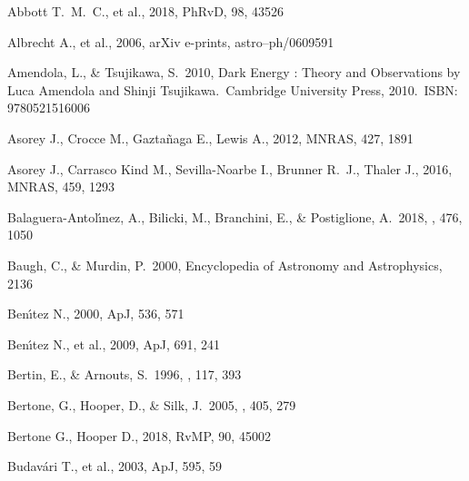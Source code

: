 \documentclass[a4paper,fleqn,usenatbib]{mnras}
\begin{document}
\begin{thebibliography}{99}

 Abbott T.~M.~C., et al., 2018, PhRvD, 98, 43526

 Albrecht A., et al., 2006, arXiv e-prints, astro–ph/0609591

 Amendola, L., \& Tsujikawa, S.\ 2010, Dark Energy : Theory and Observations by Luca Amendola and Shinji Tsujikawa.~Cambridge University Press, 2010.~ISBN: 9780521516006

 Asorey J., Crocce M., Gazta{\~n}aga E., Lewis A., 2012, MNRAS, 427, 1891

 Asorey J., Carrasco Kind M., Sevilla-Noarbe I., Brunner R.~J., Thaler J., 2016, MNRAS, 459, 1293

 Balaguera-Antol{\'{\i}}nez, A., Bilicki, M., Branchini, E., \& Postiglione, A.\ 2018, \mnras, 476, 1050 

 Baugh, C., \& Murdin, P.\ 2000, Encyclopedia of Astronomy and Astrophysics, 2136 

 Ben{\'\i}tez N., 2000, ApJ, 536, 571

 Ben{\'\i}tez N., et al., 2009, ApJ, 691, 241

 Bertin, E., \& Arnouts, S.\ 1996, \aaps, 117, 393 

 Bertone, G., Hooper, D., \& Silk, J.\ 2005, \physrep, 405, 279 

 Bertone G., Hooper D., 2018, RvMP, 90, 45002

 Budav{\'a}ri T., et al., 2003, ApJ, 595, 59


\end{thebibliography}
\end{document}
